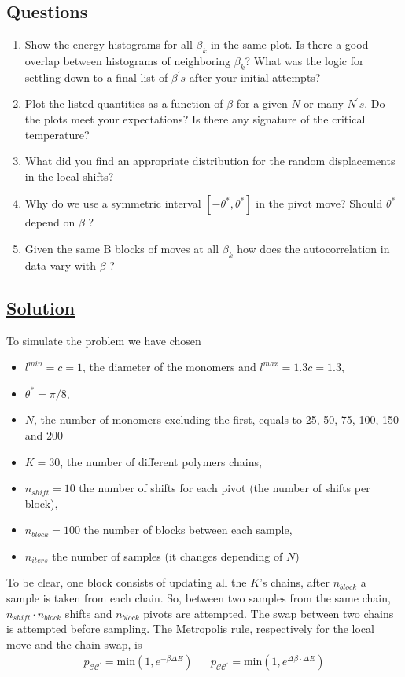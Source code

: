 \documentclass[../main.tex]{subfiles}
\begin{document}
\subsection*{Questions}

\begin{enumerate}
    \item Show the energy histograms for all $\beta_{k}$ in the same plot. Is there a good overlap between histograms of neighboring $\beta_{k}$? What was the logic for settling down to a final list of $\beta^{\prime}s$ after your initial attempts?

    \item Plot the listed quantities as a function of $\beta$  for a given $N$ or many $N^{\prime}s$. Do the plots meet your expectations? Is there any signature of the critical temperature?

    \item What did you find an appropriate distribution for the random displacements in the local shifts?

    \item Why do we use a symmetric interval $[-\theta^{*},\theta^{*}]$ in the pivot move? Should $\theta^{*}$ depend on $\beta$ ?

    \item Given the same B blocks of moves at all $\beta_{k}$ how does the autocorrelation in data vary with $\beta$ ?
\end{enumerate}

\newpage
\subsection{\underline{Solution}}
To simulate the problem we have chosen 
\begin{itemize}
    \item $l^{min} = c=1$, the diameter of the monomers and $l^{max} = 1.3c = 1.3$,
    \item $\theta^* = \pi/8$,
    \item $N$, the number of monomers excluding the first, equals to 25, 50, 75, 100, 150 and 200
    \item $K=30$, the number of different polymers chains,
    \item $n_{shift}=10$ the number of shifts for each pivot (the number of shifts per block),
    \item $n_{block} = 100$  the number of blocks between each sample,
    \item $n_{iters}$ the number of samples (it changes depending of $N$)
\end{itemize}
To be clear, one block consists of updating all the $K$'s chains, after $n_{block}$ a sample is taken from each chain. So, between two samples from the same chain, $n_{shift}\cdot n_{block}$ shifts and $n_{block}$ pivots are attempted. The swap between two chains is attempted before sampling.
The Metropolis rule, respectively for the local move and the chain swap, is
\begin{align}
    p_{\mathcal{C}\mathcal{C^{\prime}}} = \text{min}\left(1, e^{-\beta\Delta E}\right) &&     p_{\pmb{\mathcal{C}\mathcal{C^{\prime}}}} = \text{min}\left(1, e^{\Delta\beta\cdot\Delta E}\right)
\end{align}
\end{document}
